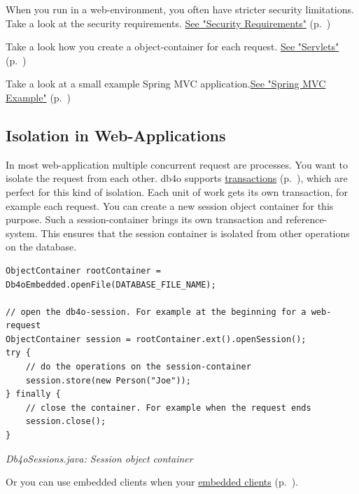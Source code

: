 When you run in a web-environment, you often have stricter security limitations. Take a look at the security requirements. \hyperref[ref:platform-specific-issues-security-requirements-on-java-platform]{See "Security Requirements"} (p.~\pageref{ref:platform-specific-issues-security-requirements-on-java-platform})

Take a look how you create a object-container for each request. \hyperref[ref:platform-specific-issues-web-servlets]{See "Servlets"} (p.~\pageref{ref:platform-specific-issues-web-servlets})

Take a look at a small example Spring MVC application.\hyperref[ref:platform-specific-issues-web-spring-mvc-example]{See "Spring MVC Example"} (p.~\pageref{ref:platform-specific-issues-web-spring-mvc-example})

\subsection{Isolation in Web-Applications}
\label{ref:platform-specific-issues-web-web-isolation}

In most web-application multiple concurrent request are processes. You want to isolate the request from each other. db4o supports \hyperref[ref:basics-acid-and-transactions]{transactions} (p.~\pageref{ref:basics-acid-and-transactions}), which are perfect for this kind of isolation. Each unit of work gets its own transaction, for example each request. You can create a new session object container for this purpose. Such a session-container brings its own transaction and reference-system. This ensures that the session container is isolated from other operations on the database.

\begin{lstlisting}
ObjectContainer rootContainer = Db4oEmbedded.openFile(DATABASE_FILE_NAME);

// open the db4o-session. For example at the beginning for a web-request
ObjectContainer session = rootContainer.ext().openSession();
try {
    // do the operations on the session-container
    session.store(new Person("Joe"));
} finally {
    // close the container. For example when the request ends
    session.close();
}
\end{lstlisting}

{\small\itshape Db4oSessions.java: Session object container\par}
\medskip

Or you can use embedded clients when your \hyperref[ref:client-server-embedded]{embedded clients} (p.~\pageref{ref:client-server-embedded}).

